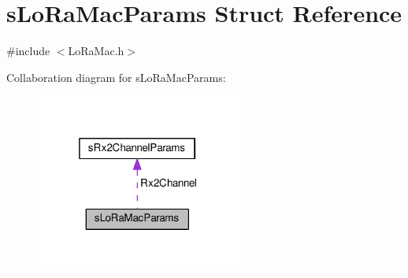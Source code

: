 \hypertarget{structsLoRaMacParams}{}\section{s\+Lo\+Ra\+Mac\+Params Struct Reference}
\label{structsLoRaMacParams}


{\ttfamily \#include $<$Lo\+Ra\+Mac.\+h$>$}



Collaboration diagram for s\+Lo\+Ra\+Mac\+Params\+:
\nopagebreak
\begin{figure}[H]
\begin{center}
\leavevmode
\includegraphics[width=193pt]{structsLoRaMacParams__coll__graph}
\end{center}
\end{figure}
